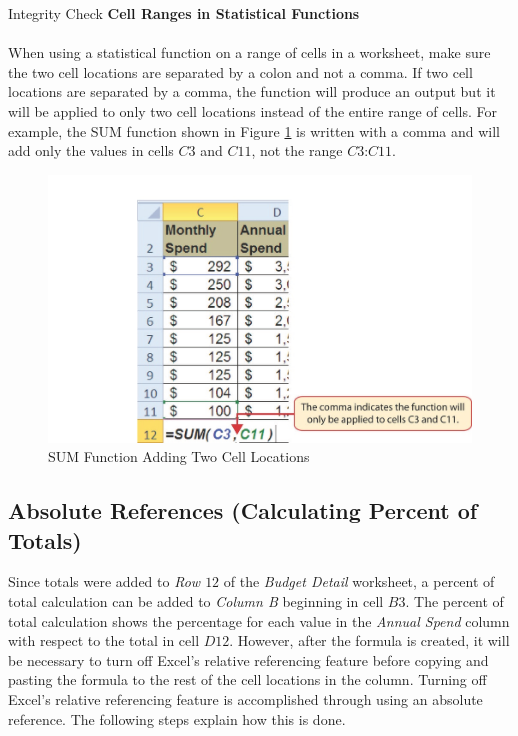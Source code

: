 \begin{center}
	\begin{infobox}{Integrity Check}
		\textbf{Cell Ranges in Statistical Functions}
		\\
		\\
		When using a statistical function on a range of cells in a worksheet, make sure the two cell locations are separated by a colon and not a comma. If two cell locations are separated by a comma, the function will produce an output but it will be applied to only two cell locations instead of the entire range of cells. For example, the SUM function shown in Figure \ref{02:fig13} is written with a comma and will add only the values in cells $ C3 $ and $ C11 $, not the range $ C3 $:$ C11 $.
	\end{infobox}
\end{center}

\begin{figure}[H]
	\centering
	\includegraphics[width=\maxwidth{.95\linewidth}]{gfx/ch02_fig13}
	\caption{SUM Function Adding Two Cell Locations}
	\label{02:fig13}
\end{figure}

\subsection{Absolute References (Calculating Percent of Totals)}

Since totals were added to \textit{Row $ 12 $} of the \textit{Budget Detail} worksheet, a percent of total calculation can be added to \textit{Column B} beginning in cell $ B3 $. The percent of total calculation shows the percentage for each value in the \textit{Annual Spend} column with respect to the total in cell $ D12 $. However, after the formula is created, it will be necessary to turn off Excel's relative referencing feature before copying and pasting the formula to the rest of the cell locations in the column. Turning off Excel's relative referencing feature is accomplished through using an absolute reference. The following steps explain how this is done.

